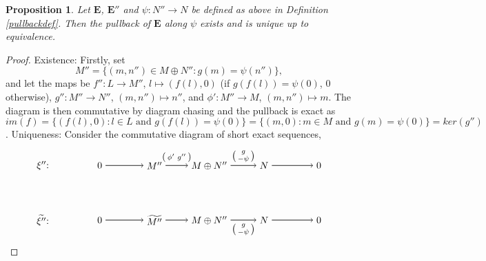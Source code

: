 \documentclass[11.5pt, twoside, a4paper, titlepage]{report}
\theoremstyle{definition}
\theoremstyle{plain}
\newtheorem{prop}[mydef]{Proposition}
\begin{document}
\begin{prop} \label{pullbackprop}
Let $\mathbf{E}$, $\mathbf{E''}$ and $\psi: N''\to N$ be defined as above in Definition \ref{pullbackdef}. Then the pullback of $\mathbf{E}$ along $\psi$ exists and is unique up to equivalence.
\end{prop}
\begin{proof}
Existence: Firstly, set
\begin{equation*}
M''=\{(m,n'')\in M\oplus N'': g(m)=\psi(n'')\},
\end{equation*}
and let the maps be $f'': L \to M''$, $l\mapsto (f(l),0)$ (if $g(f(l))=\psi(0)$, $0$ otherwise), $g'': M'' \to N''$, $(m, n'') \mapsto n''$, and $\phi': M'' \to M$, $(m, n'') \mapsto m$. The diagram is then commutative by diagram chasing and the pullback is exact as $im(f)=\{(f(l),0):l\in L\text{ and } g(f(l))=\psi(0)\}=\{(m, 0): m \in M\text{ and }g(m)=\psi(0)\}=ker(g'')$. 
Uniqueness: Consider the commutative diagram of short exact sequences,
\begin{equation*}
\begin{tikzpicture}[->,-latex, auto, main path/.style={->, semithick}, main node/.style={}]
\node	[main node]		(1) at (0,0)		{$\mathbf{\xi''}$: \quad };
\node	[main node]		(2) at (2,0)		{$0$};
\node	[main node]		(3) at (4,0)		{$M''$};
\node [main node]		(4) at (6,0)		{$M\oplus N''$};
\node [main node]		(5) at (8,0)		{$N$};
\node	[main node]		(11) at (10,0)	{$0$};

\node	[main node]		(6) at (0,-2)		{$\widetilde{\mathbf{\xi''}}$: \quad};
\node	[main node]		(7) at (2,-2)		{$0$};
\node	[main node]		(8) at (4,-2)		{$\widetilde{M''}$};
\node [main node]		(9) at (6,-2)		{$M\oplus N''$};
\node [main node]		(10) at (8,-2)	{$N$};
\node [main node]		(13) at (10,-2)	{$0$};

\draw (2) edge [main path] node [auto] {$$} (3);
\draw (3) edge [main path] node [auto] {$\begin{psmallmatrix}\phi' & g''\end{psmallmatrix}$} (4);
\draw (4) edge [main path] node [auto] {$\begin{psmallmatrix}g \\ -\psi \end{psmallmatrix}$} (5);
\draw (5) edge [main path] (11);

\draw (7) edge [main path] node [auto] {$$} (8);
\draw (8) edge [main path] node [auto, swap] {$$} (9);
\draw (9) edge [main path] node [auto, swap] {$\begin{psmallmatrix}g \\ -\psi \end{psmallmatrix}$} (10);
\draw (10) edge [main path] (13);


\end{tikzpicture}
\end{equation*}
\end{proof}
\end{document}
